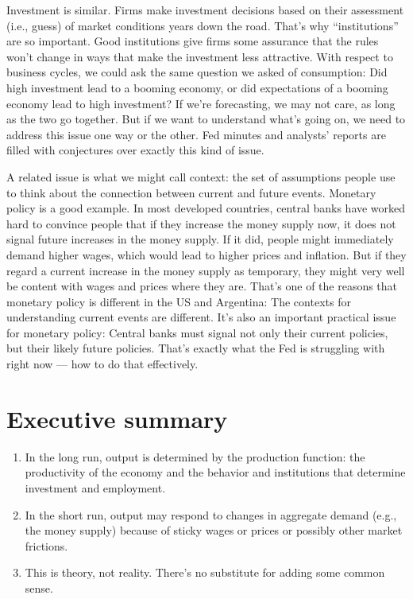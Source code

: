 Investment is similar.  Firms make investment decisions
based on their assessment (i.e., guess)
of market conditions years down the road.
That's why ``institutions'' are so important. Good institutions give firms some assurance that the rules won't change
in ways that make the investment less attractive.
With respect to business cycles, we could ask the same question
we asked of consumption: Did high investment lead to a booming economy,
or did expectations of a booming economy lead to high investment?
If we're forecasting, we may not care, as long as the two go
together.
But if we want to understand what's going on, we need to address
this issue one way or the other.
Fed minutes and analysts' reports
are filled with conjectures over exactly this kind of issue.

A related issue is what we might call context:
the set of assumptions people use to think about
the connection between current and future events.
Monetary policy is a good example.
In most developed countries,
central banks have worked hard to convince people
that if they increase the money supply now,
it does not signal future increases in the money supply.
If it did, people might immediately demand higher wages,
which would lead to higher prices and inflation.
But if they regard a current increase in the money supply as temporary,
they might very well be content with wages and prices
where they are.
That's one of the reasons that monetary policy is different
in the US and Argentina:
The contexts for understanding current events are different.
It's also an important practical issue for monetary policy: Central banks must signal not only their current policies,
but their likely future policies.
That's exactly what the Fed is struggling with right now --- how to do that effectively.




\section*{Executive summary}

\setlength{\leftmargini}{.5\oldleftmargini}
\begin{enumerate}
\item In the long run, output is determined by the production function:
the productivity of the economy and the behavior and institutions
that determine investment and employment.

\item In the short run, output may respond to changes in
aggregate demand (e.g., the money supply) because of sticky wages or prices
or possibly other market frictions.

\item This is theory, not reality.
There's no substitute for adding some common sense.
\end{enumerate}
\setlength{\leftmargini}{\oldleftmargini}

